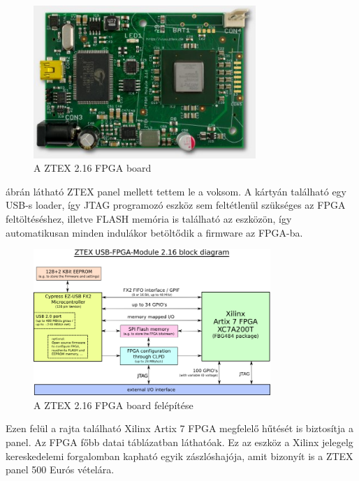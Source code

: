 \begin{figure}[!ht]
	\centering
	\includegraphics[width = 0.75\textwidth]{figures/fpga216.jpg}
	\caption{A ZTEX 2.16 FPGA board} 
	\label{fig:ztex}
\end{figure}

 ábrán látható ZTEX panel mellett tettem le a voksom. A kártyán található egy USB-s loader, így JTAG programozó eszköz sem feltétlenül szükséges az FPGA feltöltéséshez, illetve FLASH memória is található az eszközön, így automatikusan minden indulákor betöltődik a firmware az FPGA-ba.


\begin{figure}[!ht]
	\centering
	\includegraphics[width = 0.8\textwidth]{figures/usb-fpga-216.png}
	\caption{A ZTEX 2.16 FPGA board felépítése} 
	\label{fig:ztex_block}
\end{figure}


Ezen felül a rajta található Xilinx Artix 7 FPGA megfelelő hűtését is biztosítja a panel. Az FPGA főbb datai  táblázatban láthatóak. Ez az eszköz a Xilinx jelegelg kereskedelemi forgalomban kapható egyik zászlóshajója, amit bizonyít is a ZTEX panel 500 Eurós vételára.

